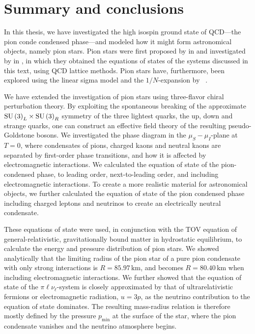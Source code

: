 \section{Summary and conclusions}


In this thesis, we have investigated the high isospin ground state of QCD---the pion conde condensed phase---and modeled how it might form astronomical objects, namely pion stars.
Pion stars were first proposed by \citeauthor{carignanoScrutinizingPionCondensed2017} in \autocite{carignanoScrutinizingPionCondensed2017} and investigated by \citeauthor{brandtNewClassCompact2018} in \autocite{brandtNewClassCompact2018}, in which they obtained the equations of states of the systems discussed in this text, using QCD lattice methods.
Pion stars have, furthermore, been explored using the linear sigma model and the $1/N$-expansion by \citeauthor{andersenBoseEinsteinCondensationPion2018}~\autocite{andersenBoseEinsteinCondensationPion2018}.

We have extended the investigation of pion stars using three-flavor chiral perturbation theory.
By exploiting the spontaneous breaking of the approximate $\text{SU}\left(3\right)_L\times\text{SU}\left(3\right)_R$ symmetry of the three lightest quarks, the up, down and strange quarks, one can construct an effective field theory of the resulting pseudo-Goldstone bosons.
We investigated the phase diagram in the $\mu_S-\mu_I$-plane at $T = 0$, where condensates of pions, charged kaons and neutral kaons are separated by first-order phase transitions, and how it is affected by electromagnetic interactions.
We calculated the equation of state of the pion-condensed phase, to leading order, next-to-leading order, and including electromagnetic interactions.
To create a more realistic material for astronomical objects, we further calculated the equation of state of the pion condensed phase including charged leptons and neutrinos to create an electrically neutral condensate.

These equations of state were used, in conjunction with the TOV equation of general-relativistic, gravitationally bound matter in hydrostatic equilibrium, to calculate the energy and pressure distribution of pion stars.
We showed analytically that the limiting radius of the pion star of a pure pion condensate with only strong interactions is $R = 85.97\,\text{km}$, and becomes $R = 80.40\,\text{km}$ when including electromagnetic interactions.
We further showed that the equation of state of the $\pi\ell\nu_\ell$-system is closely approximated by that of ultrarelativistic fermions or electromagnetic radiation, $u = 3p$, as the neutrino contribution to the equation of state dominates.
The resulting mass-radius relation is therefore mostly defined by the pressure $p_\text{min}$ at the surface of the star, where the pion condensate vanishes and the neutrino atmosphere begins.


